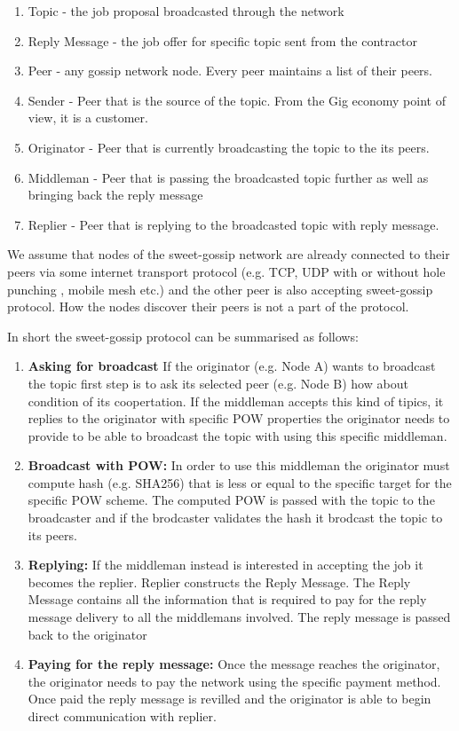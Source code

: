 \documentclass{article}
\begin{document}
\begin{enumerate}
	\item Topic - the job proposal broadcasted through the network
	\item Reply Message - the job offer for specific topic sent from the contractor
	\item Peer - any gossip network node. Every peer maintains a list of their peers.
	\item Sender - Peer that is the source of the topic. From the Gig economy point of view, it is a customer.
	\item Originator - Peer that is currently broadcasting the topic to the its peers.
	\item Middleman - Peer that is passing the broadcasted topic further as well as bringing back the reply message
	\item Replier - Peer that is replying to the broadcasted topic with reply message.
\end{enumerate}

We assume that nodes of the sweet-gossip network are already connected to their peers via some internet transport protocol (e.g. TCP, UDP with or without hole punching \cite{WebRTC}, mobile mesh etc.) and the other peer is also accepting sweet-gossip protocol. How the nodes discover their peers is not a part of the protocol.

In short the sweet-gossip protocol can be summarised as follows:

\begin{enumerate}
	\item  \textbf{Asking for broadcast} If the originator (e.g. Node A) wants to broadcast the topic first step is to ask its selected peer (e.g. Node B) how about condition of its coopertation. If the middleman accepts this kind of tipics, it replies to the originator with specific POW properties the originator needs to provide to be able to broadcast the topic with using this specific middleman.
	\item  \textbf{Broadcast with POW:} In order to use this middleman the originator must compute hash (e.g. SHA256) that is less or equal to the specific target for the specific POW scheme. The computed POW is passed with the topic to the broadcaster and if the brodcaster validates the hash it brodcast the topic to its peers.
	\item  \textbf{Replying:} If the middleman instead is interested in accepting the job it becomes the replier. Replier constructs the Reply Message. The Reply Message contains all the information that is required to pay for the reply message delivery to all the middlemans involved. The reply message is passed back to the originator
	\item  \textbf{Paying for the reply message:} Once the message reaches the originator, the originator needs to pay the network using the specific payment method. Once paid the reply message is revilled and the originator is able to begin direct communication with replier.
\end{enumerate}
\end{document}
